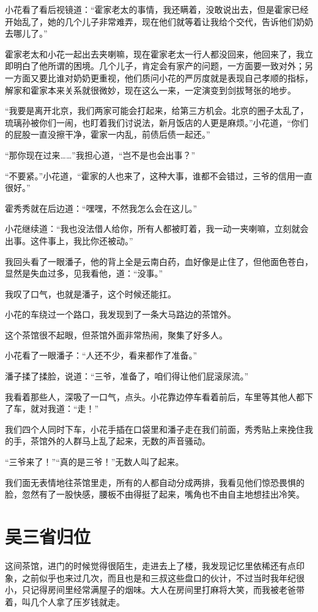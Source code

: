 小花看了看后视镜道：“霍家老太的事情，我还瞒着，没敢说出去，但是霍家已经开始乱了，她的几个儿子非常难弄，现在他们就等着让我给个交代，告诉他们奶奶去哪儿了。”

霍家老太和小花一起出去夹喇嘛，现在霍家老太一行人都没回来，他回来了，我立即明白了他所谓的困境。几个儿子，肯定会有家产的问题，一方面要一致对外；另一方面又要比谁对奶奶更重视，他们质问小花的严厉度就是表现自己孝顺的指标，解家和霍家本来关系就很微妙，现在这么一来，一定演变到剑拔弩张的地步。

“我要是离开北京，我们两家可能会打起来，给第三方机会。北京的圈子太乱了，琉璃孙被你们一闹，也盯着我们讨说法，新月饭店的人更是麻烦。”小花道，“你们的屁股一直没擦干净，霍家一内乱，前债后债一起还。”

“那你现在过来……”我担心道，“岂不是也会出事？”

“不要紧。”小花道，“霍家的人也来了，这种大事，谁都不会错过，三爷的信用一直很好。”

霍秀秀就在后边道：“嘿嘿，不然我怎么会在这儿。”

小花继续道：“我也没法借人给你，所有人都被盯着，我一动一夹喇嘛，立刻就会出事。这件事上，我比你还被动。”

我回头看了一眼潘子，他的背上全是云南白药，血好像是止住了，但他面色苍白，显然是失血过多，见我看他，道：“没事。”

我叹了口气，也就是潘子，这个时候还能扛。

小花的车绕过一个路口，我发现到了一条大马路边的茶馆外。

这个茶馆很不起眼，但茶馆外面非常热闹，聚集了好多人。

小花看了一眼潘子：“人还不少，看来都作了准备。”

潘子揉了揉脸，说道：“三爷，准备了，咱们得让他们屁滚尿流。”

我看着那些人，深吸了一口气，点头。小花靠边停车看着前后，车里等其他人都下了车，就对我道：“走！”

我们四个人同时下车，小花手插在口袋里和潘子走在我们前面，秀秀贴上来挽住我的手，茶馆外的人群马上乱了起来，无数的声音骚动。

“三爷来了！”“真的是三爷！”无数人叫了起来。

我们面无表情地往茶馆里走，所有的人都自动分成两排，我看见他们惊恐畏惧的脸，忽然有了一股快感，腰板不由得挺了起来，嘴角也不由自主地想挂出冷笑。

\chapter{吴三省归位}

这间茶馆，进门的时候觉得很陌生，走进去上了楼，我发现记忆里依稀还有点印象，之前似乎也来过几次，而且也是和三叔这些盘口的伙计，不过当时我年纪很小，只记得房间里经常满屋子的烟味。大人在房间里打麻将大笑，而我被老爸带着，叫几个人拿了压岁钱就走。

